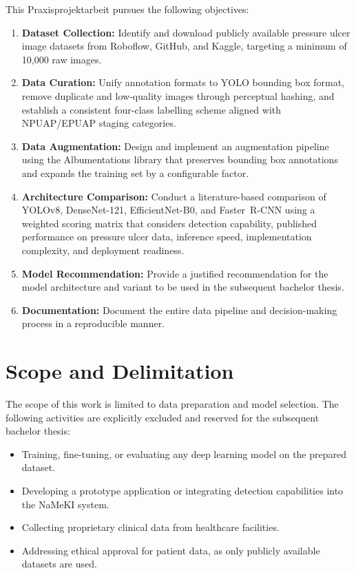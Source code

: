 \documentclass[a4paper,12pt,twoside]{report}
\begin{document}
This Praxisprojektarbeit pursues the following objectives:

\begin{enumerate}
  \item \textbf{Dataset Collection:} Identify and download publicly available
    pressure ulcer image datasets from Roboflow, GitHub, and Kaggle, targeting a
    minimum of 10,000 raw images.

  \item \textbf{Data Curation:} Unify annotation formats to YOLO bounding box
    format, remove duplicate and low-quality images through perceptual hashing,
    and establish a consistent four-class labelling scheme aligned with
    NPUAP/EPUAP staging categories.

  \item \textbf{Data Augmentation:} Design and implement an augmentation pipeline
    using the Albumentations library that preserves bounding box annotations and
    expands the training set by a configurable factor.

  \item \textbf{Architecture Comparison:} Conduct a literature-based comparison
    of YOLOv8, DenseNet-121, EfficientNet-B0, and Faster~R-CNN using a weighted
    scoring matrix that considers detection capability, published performance on
    pressure ulcer data, inference speed, implementation complexity, and
    deployment readiness.

  \item \textbf{Model Recommendation:} Provide a justified recommendation for
    the model architecture and variant to be used in the subsequent bachelor
    thesis.

  \item \textbf{Documentation:} Document the entire data pipeline and
    decision-making process in a reproducible manner.
\end{enumerate}

\section{Scope and Delimitation}
\label{sec:scope}

The scope of this work is limited to data preparation and model selection. The
following activities are explicitly excluded and reserved for the subsequent
bachelor thesis:

\begin{itemize}
  \item Training, fine-tuning, or evaluating any deep learning model on the
    prepared dataset.
  \item Developing a prototype application or integrating detection capabilities
    into the NaMeKI system.
  \item Collecting proprietary clinical data from healthcare facilities.
  \item Addressing ethical approval for patient data, as only publicly available
    datasets are used.
\end{itemize}
\end{document}
